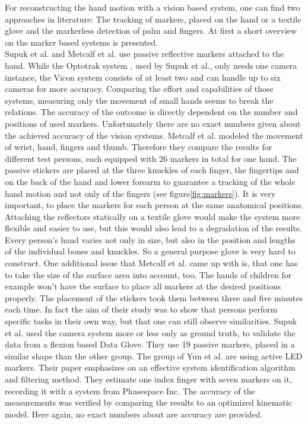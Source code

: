For reconstructing the hand motion with a vision based system, one can find two approaches in literature: The tracking of markers, placed on the hand or a textile glove and the markerless detection of palm and fingers. At first a short overview on the marker based systems is presented. \\
Supuk et al. \cite{supuk2008evaluation} and Metcalf et al. \cite{metcalf2008validation} use passive reflective markers attached to the hand. While the Optotrak system \cite{optotrak}, used by Supuk et al., only needs one camera instance, the Vicon system \cite{vicon} consists of at least two and can handle up to six cameras for more accuracy. Comparing the effort and capabilities of those systems, measuring only the movement of small hands seems to break the relations. The accuracy of the outcome is directly dependent on the number and positions of used markers. Unfortunately there are no exact numbers given about the achieved accuracy of the vision systems. Metcalf et al. modeled the movement of wrist, hand, fingers and thumb. Therefore they compare the results for different test persons, each equipped with 26 markers in total for one hand. The passive stickers are placed at the three knuckles of each finger, the fingertips and on the back of the hand and lower forearm to guarantee a tracking of the whole hand motion and not only of the fingers (see figure\ref{fig:markers}). It is very important, to place the markers for each person at the same anatomical positions. Attaching the reflectors statically on a textile glove would make the system more flexible and easier to use, but this would also lead to a degradation of the results. Every person's hand varies not only in size, but also in the position and lengths of the individual bones and knuckles. So a general purpose glove is very hard to construct. One additional issue that Metcalf et al. came up with is, that one has to take the size of the surface area into account, too. The hands of children for example won't have the surface to place all markers at the desired positions properly. The placement of the stickers took them between three and five minutes each time. In fact the aim of their study was to show that persons perform specific tasks in their own way, but that one can still observe similarities. Supuk et al. used the camera system more or less only as ground truth, to validate the data from a flexion based Data Glove. They use 19 passive markers, placed in a similar shape than the other group. The group of Yun et al. are using active LED markers. Their paper emphasizes on an effective system identification algorithm and filtering method. They estimate one index finger with seven markers on it, recording it with a system from Phasespace Inc. The accuracy of the measurements was verified by comparing the results to an optimized kinematic model. Here again, no exact numbers about are accuracy are provided.\\
